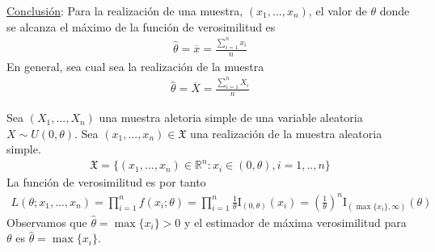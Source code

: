 \begin{ejemplo}
    \underline{Conclusión}: Para la realización de una muestra, $(x_1,...,x_n)$, el valor de $\theta$ donde se alcanza el máximo de la función de verosimilitud es
    \begin{align*}
        \hat{\theta} = \overline{x} = \frac{\sum_{i=1}^{n}{x_i}}{n}
    \end{align*}
    En general, sea cual sea la realización de la muestra
    \begin{align*}
        \hat{\theta} = \overline{X} = \frac{\sum_{i=1}^{n}{X_i}}{n}
    \end{align*}
\end{ejemplo}

\begin{ejemplo}
    Sea $(X_1,...,X_n)$ una muestra aletoria simple de una variable aleatoria $X \sim U(0,\theta)$. Sea $(x_1,...,x_n) \in \mathfrak{X}$ una realización de la muestra aleatoria simple.
    \begin{align*}
        \mathfrak{X} = \{ (x_1,...,x_n) \in \mathbb{R}^n : x_i \in (0,\theta), i = 1,..,n \}
    \end{align*}
    La función de verosimilitud es por tanto
    \begin{align*}
        L(\theta;x_1,...,x_n) = \prod_{i=1}^{n}{f(x_i;\theta)} = \prod_{i=1}^{n}{\frac{1}{\theta}\text{I}_{(0,\theta)}(x_i)} = \left( \frac{1}{\theta} \right)^{n} \text{I}_{(\max\{x_i\}, \infty)}(\theta)
    \end{align*}
    Observamos que $\hat{\theta} = \max\{x_i\} > 0$ y el estimador de máxima verosimilitud para $\theta$ es $\hat{\theta} = \max\{x_i\}$.
\end{ejemplo}

